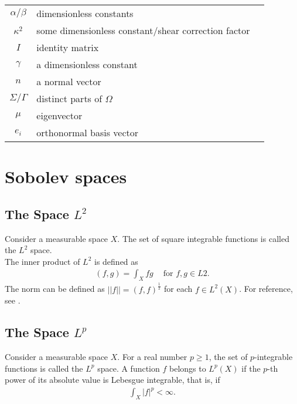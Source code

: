 \documentclass[main.tex]{subfiles}
\begin{document}
\begin{tabularx}{\textwidth}{cXr}
\( \alpha/\beta \) & dimensionless constants & \pageref{sym:alphabeta} \\
\( \kappa^2 \) & some dimensionless constant/shear correction factor & \pageref{sym:kappa2} \\
\( I \) & identity matrix & \pageref{sym:I} \\
\( \gamma \) & a dimensionless constant & \pageref{sym:gamma} \\
\( n \) & a normal vector & \pageref{sym:n} \\
\( \Sigma/\Gamma \) & distinct parts of \( \Omega \) & \pageref{sym:SigmaGamma} \\
\( \mu \) & eigenvector & \pageref{sym:mu} \\
\( e_i \) & orthonormal basis vector & \pageref{sym:e_i} \\

\bottomrule
\end{tabularx}

\section*{Sobolev spaces}

\subsection*{The Space $L^2$}
Consider a measurable space $X$. The set of square integrable functions is called the $L^2$ space.\\

The inner product of $L^2$ is defined as 
\begin{eqnarray*}
	(f,g) = \int_X fg \ \ \ \ \textrm { for } f,g \in L2.
\end{eqnarray*}
The norm can be defined as $||f|| = (f,f)^{\frac{1}{2}}$ for each $f \in L^2(X)$. For reference, see \cite{Rud53}.

\subsection*{The Space \( L^p \)}
Consider a measurable space \( X \). For a real number \( p \geq 1 \), the set of \( p \)-integrable functions is called the \( L^p \) space. A function \( f \) belongs to \( L^p(X) \) if the \( p \)-th power of its absolute value is Lebesgue integrable, that is, if
\begin{eqnarray*}
    \int_X |f|^p < \infty.
\end{eqnarray*}
\end{document}
